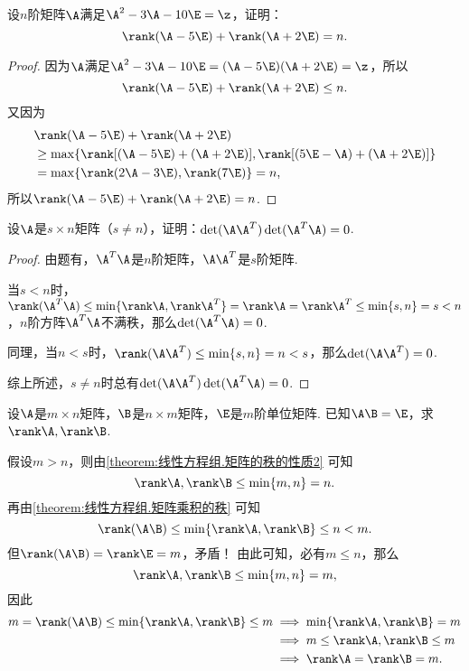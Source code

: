 \begin{example}
设\(n\)阶矩阵\(\A\)满足\(\A^2 - 3 \A - 10 \E = \z\)，证明：\[
	\rank(\A - 5\E) + \rank(\A + 2\E) = n.
\]
\begin{proof}
因为\(\A\)满足\(\A^2 - 3 \A - 10 \E = (\A - 5\E)(\A + 2\E) = \z\)，所以\[
	\rank(\A - 5\E) + \rank(\A + 2\E) \leq n.
\]
又因为\begin{align*}
	&\rank(\A - 5\E) + \rank(\A + 2\E) \\
	&\geq \max\{
		\rank[(\A - 5\E) + (\A + 2\E)],
		\rank[(5\E - \A) + (\A + 2\E)]
		\} \\
	&= \max\{ \rank(2\A - 3\E),\rank(7\E) \}
	= n,
\end{align*}
所以\(\rank(\A - 5\E) + \rank(\A + 2\E) = n\).
\end{proof}
\end{example}

\begin{example}
设\(\A\)是\(s \times n\)矩阵（\(s \neq n\)），证明：\(\det(\A \A^T) \det(\A^T \A) = 0\).
\begin{proof}
由题有，\(\A^T \A\)是\(n\)阶矩阵，\(\A \A^T\)是\(s\)阶矩阵.

当\(s < n\)时，\(\rank(\A^T \A) \leq \min\{ \rank\A, \rank\A^T \} = \rank\A = \rank\A^T \leq \min\{s,n\} = s < n\)，\(n\)阶方阵\(\A^T \A\)不满秩，那么\(\det(\A^T \A) = 0\).

同理，当\(n < s\)时，\(\rank(\A \A^T) \leq \min\{s,n\} = n < s\)，那么\(\det(\A \A^T) = 0\).

综上所述，\(s \neq n\)时总有\(\det(\A \A^T) \det(\A^T \A) = 0\).
\end{proof}
\end{example}

\begin{example}
设\(\A\)是\(m \times n\)矩阵，\(\B\)是\(n \times m\)矩阵，\(\E\)是\(m\)阶单位矩阵.
已知\(\A\B = \E\)，求\(\rank\A,\rank\B\).
\begin{solution}
假设\(m > n\)，则由\cref{theorem:线性方程组.矩阵的秩的性质2} 可知\[
\rank\A,\rank\B \leq \min\{m,n\} = n.
\]再由\cref{theorem:线性方程组.矩阵乘积的秩} 可知\[
\rank(\A\B) \leq \min\{\rank\A,\rank\B\} \leq n < m.
\]但\(\rank(\A\B) = \rank\E = m\)，矛盾！
由此可知，必有\(m \leq n\)，那么\[
\rank\A,\rank\B \leq \min\{m,n\} = m,
\]因此\begin{align*}
m = \rank(\A\B) \leq \min\{\rank\A,\rank\B\} \leq m
&\implies
\min\{\rank\A,\rank\B\} = m \\
&\implies
m \leq \rank\A,\rank\B \leq m \\
&\implies \rank\A=\rank\B=m.
\end{align*}
\end{solution}
\end{example}

